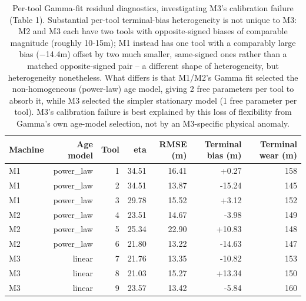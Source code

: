 \begin{table}[t]
\centering
\caption{Per-tool Gamma-fit residual diagnostics, investigating M3's calibration failure (Table 1). Substantial per-tool terminal-bias heterogeneity is not unique to M3: M2 and M3 each have two tools with opposite-signed biases of comparable magnitude (roughly 10-15\textmu m); M1 instead has one tool with a comparably large bias ($-$14.4\textmu m) offset by two much smaller, same-signed ones rather than a matched opposite-signed pair -- a different shape of heterogeneity, but heterogeneity nonetheless. What differs is that M1/M2's Gamma fit selected the non-homogeneous (power-law) age model, giving 2 free parameters per tool to absorb it, while M3 selected the simpler stationary model (1 free parameter per tool). M3's calibration failure is best explained by this loss of flexibility from Gamma's own age-model selection, not by an M3-specific physical anomaly.}
\label{tab:per-tool-diagnostics}
\begin{tabular}{lrrrrrr}
\toprule
Machine & Age model & Tool & eta & RMSE (\textmu{}m) & Terminal bias (\textmu{}m) & Terminal wear (\textmu{}m) \\
\midrule
M1 & power\_law & 1 & 34.51 & 16.41 & +0.27 & 158 \\
M1 & power\_law & 2 & 34.51 & 13.87 & -15.24 & 145 \\
M1 & power\_law & 3 & 29.78 & 15.52 & +3.12 & 152 \\
M2 & power\_law & 4 & 23.51 & 14.67 & -3.98 & 149 \\
M2 & power\_law & 5 & 25.34 & 22.90 & +10.83 & 148 \\
M2 & power\_law & 6 & 21.80 & 13.22 & -14.63 & 147 \\
M3 & linear & 7 & 21.76 & 13.35 & -10.82 & 153 \\
M3 & linear & 8 & 21.03 & 15.27 & +13.34 & 150 \\
M3 & linear & 9 & 23.57 & 13.42 & -5.84 & 160 \\
\bottomrule
\end{tabular}
\end{table}
